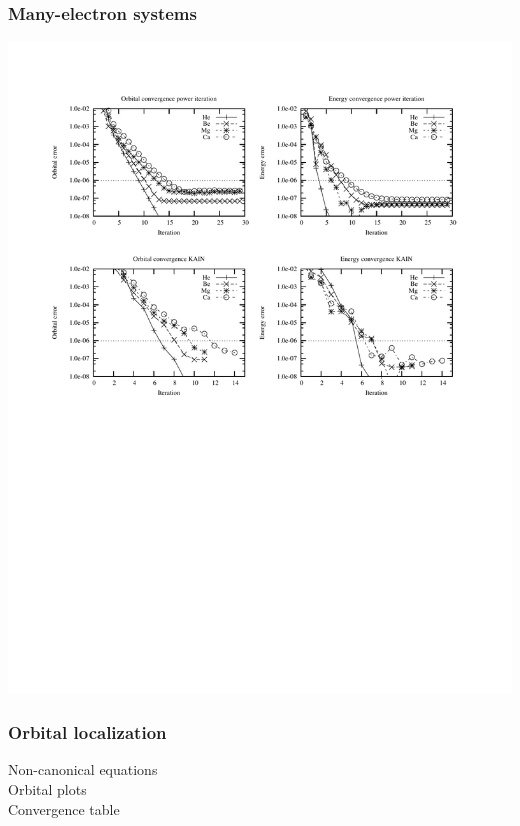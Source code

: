 \documentclass[mathserif]{beamer}
\begin{document}
\begin{frame}
    \frametitle{Many-electron systems}
    \begin{center}
	\includegraphics[scale=0.6, clip, viewport = 50 550 540 730]{figures/accuracy.pdf}
    \end{center}
\end{frame}

\begin{frame}
    \frametitle{Orbital localization}
    Non-canonical equations\\
    Orbital plots\\
    Convergence table
\end{frame}
\end{document}
